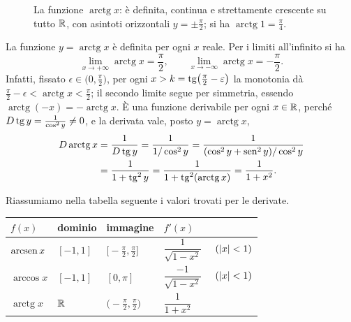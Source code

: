 \begin{figure}[htb]
\centering
{}
\caption{La funzione $\operatorname{arctg}x$: è definita, continua e strettamente crescente su
tutto $\mathbb{R}$, con asintoti orizzontali $y=\pm\frac\pi2$; si ha $\operatorname{arctg}1=\frac\pi4$.}
\label{fig:arctg}
\end{figure}

La funzione $y=\operatorname{arctg}x$ è definita per ogni $x$ reale. Per i limiti all'infinito
si ha
\begin{equation}\label{eq:arctg-infinito}
  \lim_{x\to+\infty}\operatorname{arctg}x=\frac\pi2, \qquad \lim_{x\to-\infty}\operatorname{arctg}x=-\frac\pi2 .
\end{equation}
Infatti, fissato $\epsilon\in\bigl(0,\frac\pi2\bigr)$, per ogni $x>k=\operatorname{tg}\bigl(\frac\pi2-\varepsilon\bigr)$
la monotonia dà $\frac\pi2-\epsilon<\operatorname{arctg}x<\frac\pi2$; il secondo limite segue
per simmetria, essendo $\operatorname{arctg}(-x)=-\operatorname{arctg}x$. È una funzione derivabile per ogni
$x\in\mathbb{R}$, perché $D\operatorname{tg} y=\frac1{\cos^{2}y}\neq0$, e la derivata vale, posto
$y=\operatorname{arctg}x$,
\begin{equation}\label{eq:derivata-arctg}
\begin{split}
  D\operatorname{arctg}x&=\frac1{D\operatorname{tg} y}=\frac1{1/\cos^{2}y}
  =\frac1{(\cos^{2}y+\operatorname{sen}^{2}y)/\cos^{2}y}\\
  &=\frac1{1+\operatorname{tg}^{2}y}=\frac1{1+\operatorname{tg}^{2}(\operatorname{arctg}x)}=\frac1{1+x^{2}} .
\end{split}
\end{equation}

Riassumiamo nella tabella seguente i valori trovati per le derivate.
\begin{center}
\renewcommand{\arraystretch}{1.7}
\begin{tabular}{l l l l}
\toprule
$f(x)$ & dominio & immagine & $f'(x)$\\
\midrule
$\operatorname{arcsen} x$ & $[-1,1]$ & $\bigl[-\frac\pi2,\frac\pi2\bigr]$ & $\dfrac1{\sqrt{1-x^{2}}}$ \ \ $(\lvert x\rvert<1)$\\
$\arccos x$ & $[-1,1]$ & $[0,\pi]$ & $\dfrac{-1}{\sqrt{1-x^{2}}}$ \ \ $(\lvert x\rvert<1)$\\
$\operatorname{arctg}x$ & $\mathbb{R}$ & $\bigl(-\frac\pi2,\frac\pi2\bigr)$ & $\dfrac1{1+x^{2}}$\\
\bottomrule
\end{tabular}
\end{center}

